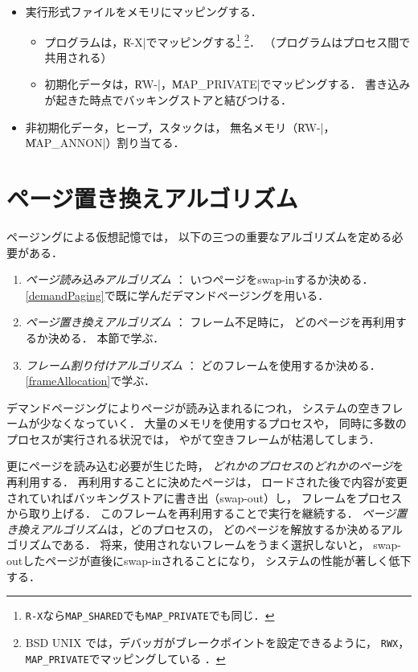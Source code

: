 \begin{itemize}
\item 実行形式ファイルをメモリにマッピングする．
  \begin{itemize}
  \item プログラムは，\|R-X|でマッピングする\footnote{
    \texttt{R-X}なら\texttt{MAP\_SHARED}でも\texttt{MAP\_PRIVATE}でも同じ．}
    \footnote{
      BSD UNIX では，デバッガがブレークポイントを設定できるように，
      \texttt{RWX}，\texttt{MAP\_PRIVATE}でマッピングしている
      \cite{execOfFreeBSD}．}．
         （プログラムはプロセス間で共用される）
  \item 初期化データは，\|RW-|，\|MAP_PRIVATE|でマッピングする．
    書き込みが起きた時点でバッキングストアと結びつける．
  \end{itemize}
\item 非初期化データ，ヒープ，スタックは，
  無名メモリ（\|RW-|，\|MAP_ANNON|）割り当てる．
\end{itemize}

\section{ページ置き換えアルゴリズム}
ページングによる仮想記憶では，
以下の三つの重要なアルゴリズムを定める必要がある．

\begin{enumerate}
\item \emph{ページ読み込みアルゴリズム} ： いつページをswap-inするか決める．
  \ref{demandPaging}で既に学んだデマンドページングを用いる．
\item \emph{ページ置き換えアルゴリズム} ： フレーム不足時に，
  どのページを再利用するか決める．
  本節で学ぶ．
\item \emph{フレーム割り付けアルゴリズム} ： どのフレームを使用するか決める．
  \ref{frameAllocation}で学ぶ．
\end{enumerate}

デマンドページングによりページが読み込まれるにつれ，
システムの空きフレームが少なくなっていく．
大量のメモリを使用するプロセスや，
同時に多数のプロセスが実行される状況では，
やがて空きフレームが枯渇してしまう．

更にページを読み込む必要が生じた時，
\emph{どれかのプロセス}の\emph{どれかのページ}を再利用する．
再利用することに決めたページは，
ロードされた後で内容が変更されていればバッキングストアに書き出（swap-out）し，
フレームをプロセスから取り上げる．
このフレームを再利用することで実行を継続する．
\emph{ページ置き換えアルゴリズム}は，どのプロセスの，
どのページを解放するか決めるアルゴリズムである．
将来，使用されないフレームをうまく選択しないと，
swap-outしたページが直後にswap-inされることになり，
システムの性能が著しく低下する．


